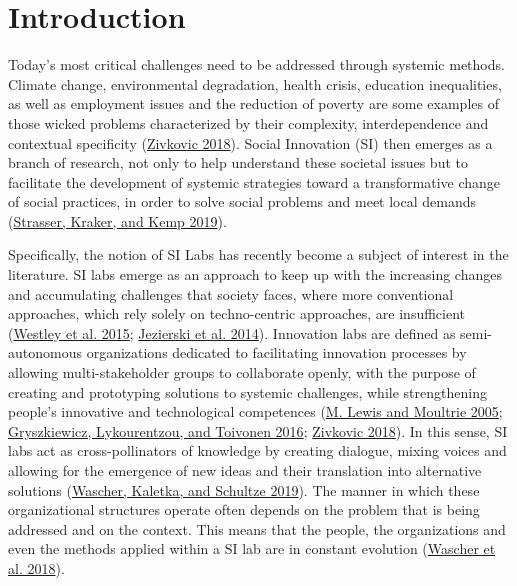 \documentclass[AMA,STIX1COL,APA,STIX2COL]{WileyNJD-v2}
\begin{document}
\hypertarget{introduction}{%
\section{Introduction}\label{introduction}}

Today's most critical challenges need to be addressed through systemic
methods. Climate change, environmental degradation, health crisis,
education inequalities, as well as employment issues and the reduction
of poverty are some examples of those wicked problems characterized by
their complexity, interdependence and contextual specificity
(\protect\hyperlink{ref-Zivkovic2018}{Zivkovic 2018}). Social Innovation
(SI) then emerges as a branch of research, not only to help understand
these societal issues but to facilitate the development of systemic
strategies toward a transformative change of social practices, in order
to solve social problems and meet local demands
(\protect\hyperlink{ref-Strasser2019}{Strasser, Kraker, and Kemp 2019}).

Specifically, the notion of SI Labs has recently become a subject of
interest in the literature. SI labs emerge as an approach to keep up
with the increasing changes and accumulating challenges that society
faces, where more conventional approaches, which rely solely on
techno-centric approaches, are insufficient
(\protect\hyperlink{ref-Westley2015}{Westley et al. 2015};
\protect\hyperlink{ref-Jezierski2014}{Jezierski et al. 2014}).
Innovation labs are defined as semi-autonomous organizations dedicated
to facilitating innovation processes by allowing multi-stakeholder
groups to collaborate openly, with the purpose of creating and
prototyping solutions to systemic challenges, while strengthening
people's innovative and technological competences
(\protect\hyperlink{ref-Lewis2005}{M. Lewis and Moultrie 2005};
\protect\hyperlink{ref-Gryszkiewicz2016}{Gryszkiewicz, Lykourentzou, and
Toivonen 2016}; \protect\hyperlink{ref-Zivkovic2018}{Zivkovic 2018}). In
this sense, SI labs act as cross-pollinators of knowledge by creating
dialogue, mixing voices and allowing for the emergence of new ideas and
their translation into alternative solutions
(\protect\hyperlink{ref-Wascher2019}{Wascher, Kaletka, and Schultze
2019}). The manner in which these organizational structures operate
often depends on the problem that is being addressed and on the context.
This means that the people, the organizations and even the methods
applied within a SI lab are in constant evolution
(\protect\hyperlink{ref-Wascher2018}{Wascher et al. 2018}).
\end{document}
